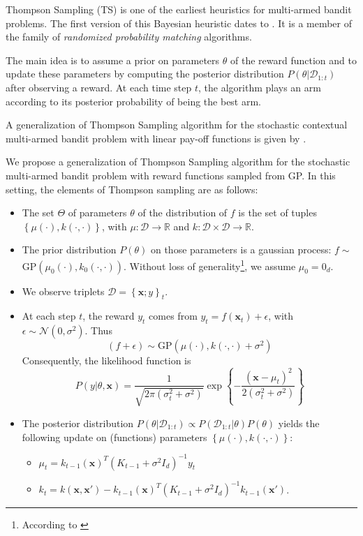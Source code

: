 \documentclass{article} %
\begin{document}
Thompson Sampling (TS) is one of the earliest heuristics for multi-armed bandit problems.
The first version of this Bayesian heuristic dates to \citet{thompson1933}.
It is a member of the family of \textit{randomized probability matching} algorithms.

The main idea is to assume a prior on parameters $\theta$ of the reward function and to update these parameters by computing the posterior distribution $P(\theta | \mathcal{D}_{1:t})$ after observing a reward. At each time step $t$, the algorithm plays an arm according to its posterior probability of being the best arm.

A generalization of Thompson Sampling algorithm for the stochastic contextual multi-armed bandit problem with linear pay-off functions is given by \citet{DBLP:conf/icml/AgrawalG13}.

We propose a generalization of Thompson Sampling algorithm for the stochastic multi-armed bandit problem with reward functions sampled from GP. In this setting, the elements of Thompson sampling are as follows:
\begin{itemize}
\item The set $\Theta$ of parameters $\theta$ of the distribution of $f$ is the set of tuples $\left\{ \mu( \cdot ), k(\cdot,\cdot) \right\}$, with $\mu : \mathcal{D} \rightarrow \mathbb{R}$ and $k : \mathcal{D} \times \mathcal{D} \rightarrow \mathbb{R}$.

\item The prior distribution $P(\theta)$ on those parameters is a gaussian process: $f \sim$ GP$(\mu_0( \cdot ), k_0(\cdot,\cdot))$.
Without loss of generality\footnote{According to \citet{Rasmussen:2005:GPM:1162254}}, we assume $\mu_0 = 0_d$.

\item We observe triplets $\mathcal{D} = {\left\{\mathbf{x}; y \right\}}_t$.

\item At each step $t$, the reward $y_t$ comes from $y_t=f(\mathbf{x}_t) + \epsilon$, with $\epsilon \sim \mathcal{N}(0, \sigma^2)$. Thus 
$$ (f+\epsilon) \sim \text{GP}(\mu( \cdot ), k(\cdot,\cdot) + \sigma^2)$$
Consequently, the likelihood function is 
$$P(y | \theta, \mathbf{x}) = \frac{1}{\sqrt{2 \pi (\sigma_t^2 + \sigma^2)}}\exp \left\{ -  \frac{ {(\mathbf{x} - \mu_t)}^2 }{2 (\sigma_t^2 + \sigma^2)} \right\}$$

\item The posterior distribution $P(\theta | \mathcal{D}_{1:t}) \propto P(\mathcal{D}_{1:t} | \theta) P(\theta)$ yields the following update on (functions) parameters $\left\{ \mu( \cdot ), k(\cdot,\cdot) \right\}$: 
	\begin{itemize}
	\item $\mu_t = k_{t-1}(\mathbf{x})^T {(K_{t-1} + \sigma^2 I_d)}^{-1} y_t$
	\item $k_t = k(\mathbf{x}, \mathbf{x}') - k_{t-1}(\mathbf{x})^T {(K_{t-1} + \sigma^2 I_d)}^{-1} k_{t-1}(\mathbf{x'}) $.
	\end{itemize}
\end{itemize}
\end{document}
